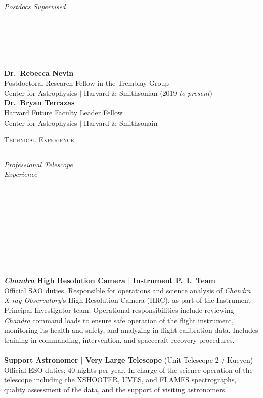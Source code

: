 \documentclass[11pt]{article}
\makeatletter
\def\vhrulefill#1{\leavevmode\leaders\hrule\@height#1\hfill \kern\z@}
\makeatother
\begin{document}
\vspace{2mm}

\hspace{2.5mm} \parbox{1.5in}{\textit{Postdocs Supervised \\\\\\\\\\\\}} \parbox{5.15in}{\textbf{Dr.~Rebecca Nevin} \\ Postdoctoral Research Fellow in the Tremblay Group \\
Center for Astrophysics $|$ Harvard \& Smithsonian (2019 \textit{to present})\\

\textbf{Dr.~Bryan Terrazas} \\
Harvard Future Faculty Leader Fellow\\
Center for Astrophysics $|$ Harvard \& Smithsonain
}

\clearpage



\textsc{Technical Experience} \vhrulefill{0.4pt}

\vspace{5mm}


\hspace{2.5mm} \parbox{1.5in}{\textit{Professional Telescope \\ Experience \\\\\\\\\\\\\\\\\\\\}} \parbox{5.15in}{
\textbf{\textit{Chandra} High Resolution Camera $|$ Instrument P.~I.~Team}\\
Official SAO duties. Responsible for operations and science analysis
of \textit{Chandra X-ray Observatory}'s High Resolution Camera (HRC), as part of the Instrument Principal Investigator team. Operational responsibilities include reviewing \textit{Chandra} command loads to ensure safe operation of the flight instrument, monitoring its health and safety, and analyzing in-flight calibration data. Includes training in commanding, intervention, and spacecraft recovery procedures.
\\\\
\textbf{Support Astronomer $|$ Very Large Telescope} (Unit Telescope 2 / Kueyen)\\
Official ESO duties; 40 nights per year. In charge of the science operation of the telescope including the XSHOOTER, UVES, and FLAMES spectrographs, quality assessment of the data, and the support of visiting astronomers.
}\\
\end{document}
